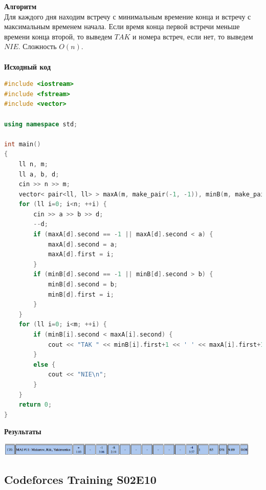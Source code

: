 \documentclass[a4paper,12pt]{article}
\begin{document}
\textbf{{\large Алгоритм}} \\
Для каждого дня находим встречу с минимальным времение конца и встречу с максимальным временем начала. Если время конца первой встречи меньше времени конца второй, то выведем $TAK$ и номера встреч, если нет, то выведем $NIE$. Сложность $O(n)$. \\ 
\\
\textbf{{\large Исходный код}}
\begin{lstlisting}[language=C++]
#include <iostream>
#include <fstream>
#include <vector>

using namespace std;

int main()
{
    ll n, m;
    ll a, b, d;
    cin >> n >> m;
    vector< pair<ll, ll> > maxA(m, make_pair(-1, -1)), minB(m, make_pair(-1, -1));
    for (ll i=0; i<n; ++i) {
        cin >> a >> b >> d;
        --d;
        if (maxA[d].second == -1 || maxA[d].second < a) {
            maxA[d].second = a;
            maxA[d].first = i;
        }
        if (minB[d].second == -1 || minB[d].second > b) {
            minB[d].second = b;
            minB[d].first = i;
        }
    }
    for (ll i=0; i<m; ++i) {
        if (minB[i].second < maxA[i].second) {
            cout << "TAK " << minB[i].first+1 << ' ' << maxA[i].first+1 << '\n';
        }
        else {
            cout << "NIE\n";
        }
    }
    return 0;
}

\end{lstlisting}

\textbf{{\large Результаты}} \\
\begin{center}
\includegraphics[width=0.95\textwidth]{OC_Central_Europe/OC_Central_Europe_result.png}\\ [1cm]
\end{center}



%
%
\newpage
\subsection{Codeforces Training S02E10}
\end{document}
